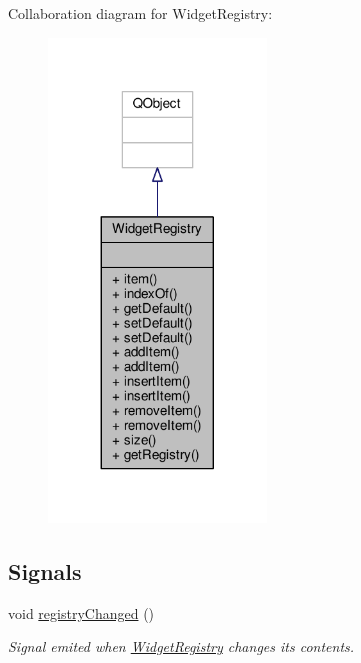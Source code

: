 Collaboration diagram for Widget\+Registry\+:
\nopagebreak
\begin{figure}[H]
\begin{center}
\leavevmode
\includegraphics[width=164pt]{class_widget_registry__coll__graph}
\end{center}
\end{figure}
\subsection*{Signals}
\begin{DoxyCompactItemize}
\item 
void \hyperlink{class_widget_registry_aaf17eb75aaf18be5094dfd96f2d96fcc}{registry\+Changed} ()
\begin{DoxyCompactList}\small\item\em Signal emited when \hyperlink{class_widget_registry}{Widget\+Registry} changes its contents. \end{DoxyCompactList}\end{DoxyCompactItemize}
